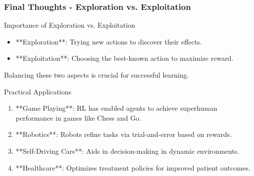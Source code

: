 \documentclass[aspectratio=169]{beamer}
\begin{document}
\begin{frame}[fragile]
    \frametitle{Final Thoughts - Exploration vs. Exploitation}
    \begin{block}{Importance of Exploration vs. Exploitation}
        \begin{itemize}
            \item **Exploration**: Trying new actions to discover their effects.
            \item **Exploitation**: Choosing the best-known action to maximize reward.
        \end{itemize}
        Balancing these two aspects is crucial for successful learning.
    \end{block}
    
    \begin{block}{Practical Applications}
        \begin{enumerate}
            \item **Game Playing**: RL has enabled agents to achieve superhuman performance in games like Chess and Go.
            \item **Robotics**: Robots refine tasks via trial-and-error based on rewards.
            \item **Self-Driving Cars**: Aids in decision-making in dynamic environments.
            \item **Healthcare**: Optimizes treatment policies for improved patient outcomes.
        \end{enumerate}
    \end{block}
\end{frame}
\end{document}

